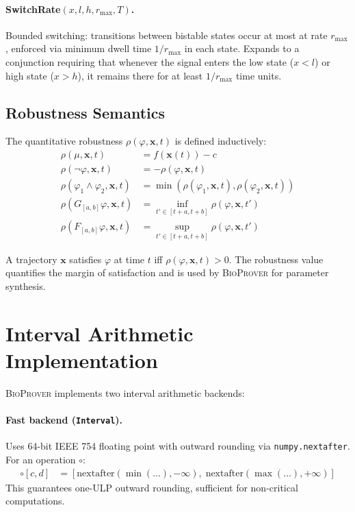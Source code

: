 \documentclass[11pt]{article}
\newcommand{\bioprover}{\textsc{BioProver}}
\begin{document}
\paragraph{SwitchRate$(x, l, h, r_{\max}, T)$.}
Bounded switching: transitions between bistable states occur at most
at rate $r_{\max}$, enforced via minimum dwell time $1/r_{\max}$ in
each state. Expands to a conjunction requiring that whenever the
signal enters the low state ($x < l$) or high state ($x > h$), it
remains there for at least $1/r_{\max}$ time units.

\subsection{Robustness Semantics}

The quantitative robustness $\rho(\varphi, \mathbf{x}, t)$ is defined
inductively:
\begin{align}
\rho(\mu, \mathbf{x}, t) &= f(\mathbf{x}(t)) - c \\
\rho(\neg\varphi, \mathbf{x}, t) &= -\rho(\varphi, \mathbf{x}, t) \\
\rho(\varphi_1 \land \varphi_2, \mathbf{x}, t) &=
  \min(\rho(\varphi_1, \mathbf{x}, t), \rho(\varphi_2, \mathbf{x}, t)) \\
\rho(G_{[a,b]}\varphi, \mathbf{x}, t) &=
  \inf_{t' \in [t+a, t+b]} \rho(\varphi, \mathbf{x}, t') \\
\rho(F_{[a,b]}\varphi, \mathbf{x}, t) &=
  \sup_{t' \in [t+a, t+b]} \rho(\varphi, \mathbf{x}, t')
\end{align}

A trajectory $\mathbf{x}$ satisfies $\varphi$ at time $t$ iff
$\rho(\varphi, \mathbf{x}, t) > 0$. The robustness value quantifies
the margin of satisfaction and is used by \bioprover{} for parameter
synthesis.

\section{Interval Arithmetic Implementation}
\label{app:interval}

\bioprover{} implements two interval arithmetic backends:

\paragraph{Fast backend (\texttt{Interval}).}
Uses 64-bit IEEE 754 floating point with outward rounding via
\texttt{numpy.nextafter}. For an operation $\circ$:
\begin{align}
[a,b] \circ [c,d] &= [\text{nextafter}(\min(\ldots), -\infty),\;
                       \text{nextafter}(\max(\ldots), +\infty)]
\end{align}
This guarantees one-ULP outward rounding, sufficient for non-critical
computations.
\end{document}

